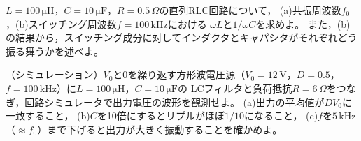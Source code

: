 \begin{章末問題}
\item \label{ex4.6}
$L = 100\,\mathrm{\mu H}$，$C = 10\,\mathrm{\mu F}$，$R = 0.5\,\Omega$の直列RLC回路について，
(a)共振周波数$f_0$，(b)スイッチング周波数$f = 100$\,kHzにおける
$\omega L$と$1/\omega C$を求めよ。
また，(b)の結果から，スイッチング成分に対してインダクタとキャパシタがそれぞれどう振る舞うかを述べよ。

\item \label{ex4.7}
（シミュレーション）$V_0$と$0$を繰り返す方形波電圧源（$V_0 = 12$\,V，$D = 0.5$，
$f = 100$\,kHz）に$L = 100\,\mathrm{\mu H}$，$C = 10\,\mathrm{\mu F}$の
LCフィルタと負荷抵抗$R = 6\,\Omega$をつなぎ，回路シミュレータで出力電圧の波形を観測せよ。
(a)出力の平均値が$DV_0$に一致すること，
(b)$C$を10倍にするとリプルがほぼ$1/10$になること，
(c)$f$を$5$\,kHz（$\approx f_0$）まで下げると出力が大きく振動することを確かめよ。
\end{章末問題}
